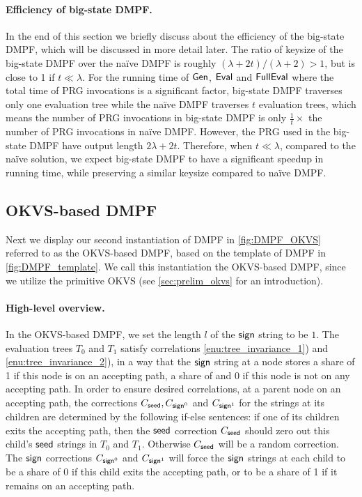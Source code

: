 \paragraph{Efficiency of big-state DMPF.}In the end of this section we briefly discuss about the efficiency of the big-state DMPF, which will be discussed in more detail later. The ratio of keysize of the big-state DMPF over the na\"ive DMPF is roughly $(\lambda+2t)/(\lambda+2)>1$, but is close to 1 if $t\ll \lambda$. For the running time of ${\sf Gen}$, ${\sf Eval}$ and ${\sf FullEval}$ where the total time of PRG invocations is a significant factor, big-state DMPF traverses only one evaluation tree while the na\"ive DMPF traverses $t$ evaluation trees, which means the number of PRG invocations in big-state DMPF is only $\frac1t\times$ the number of PRG invocations in na\"ive DMPF. However, the PRG used in the big-state DMPF have output length $2\lambda+2t$. Therefore, when $t\ll\lambda$, compared to the na\"ive solution, we expect big-state DMPF to have a significant speedup in running time, while preserving a similar keysize compared to na\"ive DMPF.  

\subsection{OKVS-based DMPF}\label{sec:OKVS_based_DMPF}
Next we display our second instantiation of DMPF in \cref{fig:DMPF_OKVS} referred to as the OKVS-based DMPF, based on the template of DMPF in \cref{fig:DMPF_template}. We call this instantiation the OKVS-based DMPF, since we utilize the primitive OKVS (see \cref{sec:prelim_okvs} for an introduction). 

\paragraph{High-level overview. }In the OKVS-based DMPF, we set the length $l$ of the ${\sf sign}$ string to be $1$. The evaluation trees $T_0$ and $T_1$ satisfy correlations \ref{enu:tree_invariance_1}) and \ref{enu:tree_invariance_2}), in a way that 
the ${\sf sign}$ string at a node stores a share of 1 if this node is on an accepting path, a share of and 0 if this node is not on any accepting path. 
In order to ensure desired correlations, at a parent node on an accepting path, the corrections $C_{\sf seed}, C_{{\sf sign}^0}$ and $C_{{\sf sign}^1}$ for the strings at its children are determined by the following if-else sentences: if one of its children exits the accepting path, then the ${\sf seed}$ correction $C_{\sf seed}$ should zero out this child's ${\sf seed}$ strings in $T_0$ and $T_1$. Otherwise $C_{\sf seed}$ will be a random correction. The ${\sf sign}$ corrections $C_{{\sf sign}^0}$ and $C_{{\sf sign}^1}$ will force the ${\sf sign}$ strings at each child to be a share of 0 if this child exits the accepting path, or to be a share of 1 if it remains on an accepting path.  

